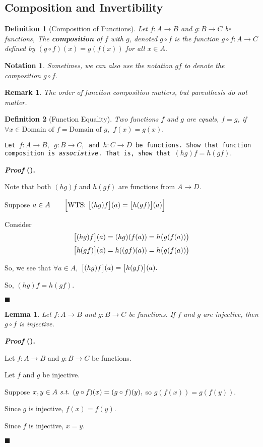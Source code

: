\documentclass[12pt,a4paper]{article}
\newtheorem{nota}{Notation}[section]
\newtheorem{df}{Definition}[subsection]
\newtheorem{lem}{Lemma}[subsection]
\newcounter{nprf}[subsection]
\newtheorem*{rmk}{\indent Remark}
\newenvironment*{prf}{\par\indent\textbf{\textit{Proof} (\stepcounter{nprf}\thenprf). }\par }{\par\hfill $\blacksquare$\par}
\def\of{\circ}
\def\st{\emph{ s.t. }}
\begin{document}
\subsection{Composition and Invertibility}
\begin{df}[Composition of Functions]
	Let $f:A\to B$ and $g:B\to C$ be functions, The \textbf{composition} of $f$ with $g$, denoted $g\of f$ is the function $g\of f:A\to C$ defined by $(g\of f)(x)=g(f(x))$ for all $x\in A.$	
\end{df}
\begin{nota}
	Sometimes, we can also use the notation $gf$ to denote the composition $g\of f.$	
\end{nota}
\begin{rmk}
	The order of function composition matters, but parenthesis do not matter.	
\end{rmk}
\begin{df}[Function Equality]
	Two functions $f$ and $g$ are equals, $f=g$, if $\forall x\in\text{Domain of }f=\text{Domain of }g,$ $f(x)=g(x).$
\end{df}
\begin{framed}
\noindent\texttt{Let $f:A\to B,$ $g:B\to C,$ and $h:C\to D$ be functions. Show that function composition is \textit{associative}. That is, show that $(hg)f=h(gf).$}
\begin{prf}
	Note that both $(hg)f$ and $h(gf)$ are functions from $A\to D$.\par Suppose $a\in A\qquad\qty\Big[\text{WTS: }\qty\big[(hg)f](a)=\qty\big[h(gf)](a)]$\par Consider \[\qty\big[(hg)f](a)=(hg)(f(a))=h\qty\big(g(f(a)))\] \[\qty\big[h(gf)](a)=h\qty((gf)(a))=h\qty\big(g(f(a)))\]\par So, we see that $\forall a\in A,$ $\qty\big[(hg)f](a)=\qty\big[h(gf)](a).$\par So, $(hg)f=h(gf).$
\end{prf}
\end{framed}
\begin{framed}
\begin{lem}\label{lem3.3.1}
	Let $f:A\to B$ and $g: B\to C$ be functions. If $f$ and $g$ are injective, then $g\of f$ is injective. 
\end{lem}
\begin{prf}
	Let $f:A\to B$ and $g:B\to C$ be functions.\par Let $f$ and $g$ be injective.\par Suppose $x,y\in A\st (g\of f)(x)=(g\of f)(y),$ so $g(f(x))=g(f(y)).$\par Since $g$ is injective, $f(x)=f(y).$\par Since $f$ is injective, $x=y.$
\end{prf}
\end{framed}
\end{document}
